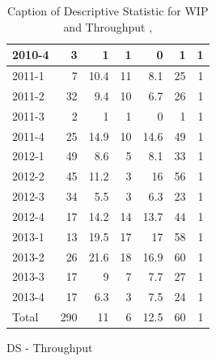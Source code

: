 \documentclass[UKenglish]{ifimaster}  %
\begin{document}
\begin{appendices}
\begin{table}[!htbp]
\begin{adjustwidth}{-1.5cm}{}
\begin{subfigure}[b]{0.3\textwidth}
{\begin{tabular}{ | l | r | r | r | r | r | r | }
 2010-4  & 3 & 1 & 1 & 0 &1 & 1 \\ \hline
 2011-1  & 7 & 10.4 & 11 & 8.1 & 25 & 1 \\ \hline
 2011-2  & 32 & 9.4 & 10 & 6.7 & 26 & 1 \\ \hline
 2011-3  & 2 & 1 & 1 & 0 &1 & 1 \\ \hline
 2011-4  & 25 & 14.9 & 10 & 14.6 & 49 & 1 \\ \hline
 2012-1  & 49 & 8.6 & 5 & 8.1 & 33 & 1 \\ \hline
 2012-2  & 45 & 11.2 & 3 & 16 & 56 & 1 \\ \hline
 2012-3  & 34 & 5.5 & 3 & 6.3 & 23 & 1 \\ \hline
 2012-4  & 17 & 14.2 & 14 & 13.7 & 44 & 1 \\ \hline
 2013-1  & 13 & 19.5 & 17 & 17 & 58 & 1 \\ \hline
 2013-2  & 26 & 21.6 & 18 & 16.9 & 60 & 1 \\ \hline
 2013-3  & 17 & 9 & 7 & 7.7 & 27 & 1 \\ \hline
 2013-4  & 17 & 6.3 & 3 & 7.5 & 24 & 1 \\ \hline
 Total & 290 & 11 & 6 & 12.5 & 60 & 1 \\ \hline
\end{tabular}
}
\caption{DS - Throughput}
 \label{DS:Throughput:1}
\end{subfigure}
\end{adjustwidth}
\caption[Optional caption for list of figures]{Caption of Descriptive Statistic for WIP and Throughput  , }
\label{DS:1:1}
\end{table}



\end{appendices}
\end{document}
